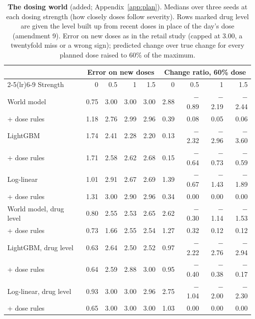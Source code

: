 \begin{table}[t]
\centering
\caption{\textbf{The dosing world} (added; Appendix~\ref{app:plan}). Medians over three seeds at each dosing strength
(how closely doses follow severity). Rows marked drug level are given the level built up from recent doses in
place of the day's dose (amendment 9). Error on new doses as in the retail study (capped at 3.00, a twentyfold miss or a
wrong sign); predicted change over true change for every planned dose raised to 60\% of the maximum.}
\label{tab:dosing}
\footnotesize\setlength{\tabcolsep}{3pt}
\begin{tabular}{lrrrrrrrr}
\toprule
 & \multicolumn{4}{c}{Error on new doses} & \multicolumn{4}{c}{Change ratio, 60\% dose} \\
\cmidrule(lr){2-5}\cmidrule(lr){6-9}
Strength & 0 & 0.5 & 1 & 1.5 & 0 & 0.5 & 1 & 1.5 \\
\midrule
World model & 0.75 & 3.00 & 3.00 & 3.00 & 2.88 & $-$0.89 & $-$2.19 & $-$2.44 \\
\quad + dose rules & 1.18 & 2.76 & 2.99 & 2.96 & 0.39 & 0.08 & 0.05 & 0.06 \\
LightGBM & 1.74 & 2.41 & 2.28 & 2.20 & 0.13 & $-$2.32 & $-$2.96 & $-$3.60 \\
\quad + dose rules & 1.71 & 2.58 & 2.62 & 2.68 & 0.15 & $-$0.64 & $-$0.73 & $-$0.59 \\
Log-linear & 1.01 & 2.91 & 2.67 & 2.69 & 1.39 & $-$0.67 & $-$1.43 & $-$1.89 \\
\quad + dose rules & 1.31 & 3.00 & 2.90 & 2.96 & 0.34 & 0.00 & 0.00 & 0.00 \\
World model, drug level & 0.80 & 2.55 & 2.53 & 2.65 & 2.62 & $-$0.30 & $-$1.14 & $-$1.53 \\
\quad + dose rules & 0.73 & 1.66 & 2.55 & 2.54 & 1.27 & 0.32 & 0.12 & 0.12 \\
LightGBM, drug level & 0.63 & 2.64 & 2.50 & 2.52 & 0.97 & $-$2.22 & $-$2.76 & $-$2.94 \\
\quad + dose rules & 0.64 & 2.59 & 2.88 & 3.00 & 0.95 & $-$0.40 & $-$0.38 & $-$0.17 \\
Log-linear, drug level & 0.93 & 3.00 & 3.00 & 2.96 & 2.75 & $-$1.04 & $-$2.00 & $-$2.30 \\
\quad + dose rules & 0.65 & 3.00 & 3.00 & 3.00 & 1.03 & 0.00 & 0.00 & 0.00 \\
\bottomrule
\end{tabular}
\end{table}
